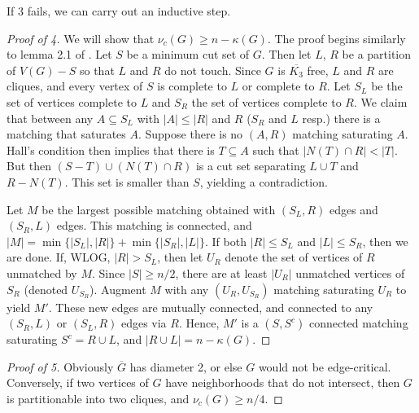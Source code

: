 \documentclass[12pt]{article}
\newcommand{\kfree}{$\overline{K_3}$ free\xspace}
\begin{document}
If 3 fails, we can carry out an inductive step.

\begin{proof}[Proof of 4]
	We will show that $\nu_c(G) \geq n-\kappa(G)$. The proof begins similarly to lemma 2.1 of \cite{blas}. Let $S$ be a minimum cut set of $G$.  Then let $L$, $R$ be a partition of $V(G) - S$ so that $L$ and $R$ do not touch.  Since $G$ is \kfree, $L$ and $R$ are cliques, and every vertex of $S$ is complete to $L$ or complete to $R$.  Let $S_L$ be the set of vertices complete to $L$ and $S_R$ the set of vertices complete to $R$.    We claim that between any $A \subseteq S_L$ with $|A| \leq |R|$ and $R$ ($S_R$ and $L$ resp.) there is a matching that saturates $A$.  Suppose there is no $(A, R)$ matching saturating $A$.  Hall's condition then implies that there is $T\subseteq A$ such that $|N(T)\cap R| < |T|$. But then $(S-T)\cup (N(T)\cap R)$ is a cut set separating $L\cup T$ and $R-N(T)$. This set is smaller than $S$, yielding a contradiction.   

Let $M$ be the largest possible matching obtained with $(S_L,R)$ edges and $(S_R,L)$ edges.  This matching is connected, and $|M| = \min\{|S_L|, |R|\} + \min\{|S_R|, |L|\}$.  If both $|R| \leq S_L$ and $|L| \leq S_R$, then we are done.  If, WLOG,  $|R| > S_L$, then let $U_R$ denote the set of vertices of $R$ unmatched by $M$.  Since $|S|\geq n/2$, there are at least $|U_R|$ unmatched vertices of $S_R$ (denoted $U_{S_R}$).  Augment $M$ with any $(U_R , U_{S_R})$ matching saturating $U_R$ to yield $M'$.  These new edges are mutually connected, and connected to any $(S_R,L)$ or $(S_L, R)$ edges via $R$.  Hence, $M'$ is a $(S,S^c)$ connected matching saturating $S^c = R\cup L$, and $|R\cup L| = n-\kappa(G)$. 
\end{proof}

\begin{proof}[Proof of 5]
 Obviously $\overline{G}$ has diameter 2, or else $G$ would not be edge-critical.  Conversely, if two vertices of $G$ have neighborhoods that do not intersect, then $G$ is partitionable into two cliques, and $\nu_c(G) \geq n/4$.
\end{proof}


\end{document}

